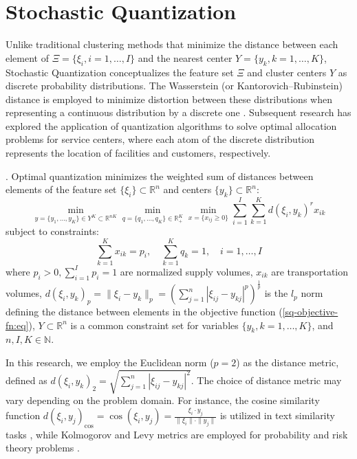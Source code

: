 \section{Stochastic Quantization}

Unlike traditional clustering methods that minimize the distance between each element of $\Xi = \{\xi_i, i = 1, \ldots, I\}$ and the nearest center $Y = \{y_k, k = 1, \ldots, K\}$, Stochastic Quantization conceptualizes the feature set $\Xi$ and cluster centers $Y$ as discrete probability distributions. The Wasserstein (or Kantorovich–Rubinstein) distance is employed to minimize distortion between these distributions when representing a continuous distribution by a discrete one \cite{Kuzmenko_Uryasev_2019,Lakshmanan_Pichler_2023}. Subsequent research \cite{Kuzmenko_Uryasev_2019,Norkin_Onishchenko_2005} has explored the application of quantization algorithms to solve optimal allocation problems for service centers, where each atom of the discrete distribution represents the location of facilities and customers, respectively.
\begin{definition}
    \label{Stochastic Quantization} \cite{Kuzmenko_Uryasev_2019}. Optimal quantization minimizes the weighted sum of distances between elements of the feature set $\{\xi_i\} \subset \mathbb{R}^{n}$ and centers $\{y_k\} \subset \mathbb{R}^{n}$:
    \begin{equation}
        \label{sq-objective-fn:eq}
            \min_{y = \{ y_1, \ldots, y_K \} \in Y^K \subset \mathbb{R}^{nK}} \min_{q = \{ q_1, \ldots, q_K \} \in \mathbb{R}^K_{+}} \min_{x = \{ x_{ij} \geq 0 \}} \sum_{i=1}^I \sum_{k=1}^K d(\xi_i, y_k)^r x_{ik}
    \end{equation}
    subject to constraints:
    \begin{equation}
        \label{sq-objective-constraints:eq}
            \sum_{k=1}^K x_{ik} = p_i, \quad \sum_{k=1}^K q_k = 1, \quad i = 1, \ldots, I
    \end{equation}
    \noindent where $p_i > 0, \sum_{i=1}^I p_i = 1$ are normalized supply volumes, $x_{ik}$ are transportation volumes, $ d(\xi_i, y_k)_p = \| \xi_i - y_k \|_p = (\sum_{j=1}^n | \xi_{ij} - y_{kj} |^p)^{\frac{1}{p}} $ is the $l_p$ norm defining the distance between elements in the objective function (\ref{sq-objective-fn:eq}), $Y \subset \mathbb{R}^{n}$ is a common constraint set for variables $\{y_k, k = 1, \ldots, K\}$, and $n, I, K \in \mathbb{N}$.
\end{definition}
In this research, we employ the Euclidean norm ($p = 2$) as the distance metric, defined as $ d(\xi_i, y_k)_2 = \sqrt{\sum_{j=1}^n | \xi_{ij} - y_{kj} |^2} $. The choice of distance metric may vary depending on the problem domain. For instance, the cosine similarity function $ d(\xi_i, y_j)_{\text{cos}} = \cos(\xi_i, y_j) = \frac{\xi_i \cdot y_j}{\| \xi_i \| \cdot \| y_j \|} $ is utilized in text similarity tasks \cite{Babic_2020,vor_der_bruck_pouly_2019}, while Kolmogorov and Levy metrics are employed for probability and risk theory problems \cite{Kuzmenko_Uryasev_2019}.

